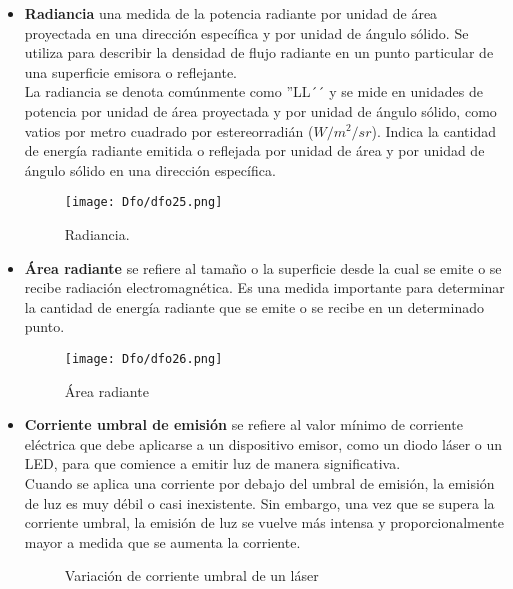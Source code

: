 \documentclass[
	12pt, %
	fleqn, %
	a4paper, %
	oneside, %
]{LegrandOrangeBook}
\begin{document}
\begin{itemize}
\item \textbf{Radiancia} una medida de la potencia radiante por unidad de área proyectada en una dirección específica y por unidad de ángulo sólido. Se utiliza para describir la densidad de flujo radiante en un punto particular de una superficie emisora o reflejante.\\
La radiancia se denota comúnmente como ''LL´´ y se mide en unidades de potencia por unidad de área proyectada y por unidad de ángulo sólido, como vatios por metro cuadrado por estereorradián ($W/m^2/sr$). Indica la cantidad de energía radiante emitida o reflejada por unidad de área y por unidad de ángulo sólido en una dirección específica.
\begin{figure}[H]
\centering
\texttt{[image: Dfo/dfo25.png]}
\caption{Radiancia.}
\end{figure}

\item \textbf{Área radiante} se refiere al tamaño o la superficie desde la cual se emite o se recibe radiación electromagnética. Es una medida importante para determinar la cantidad de energía radiante que se emite o se recibe en un determinado punto.
\begin{figure}[H]
\centering
\texttt{[image: Dfo/dfo26.png]}
\caption{Área radiante}
\end{figure}

\item \textbf{Corriente umbral de emisión} se refiere al valor mínimo de corriente eléctrica que debe aplicarse a un dispositivo emisor, como un diodo láser o un LED, para que comience a emitir luz de manera significativa.\\
Cuando se aplica una corriente por debajo del umbral de emisión, la emisión de luz es muy débil o casi inexistente. Sin embargo, una vez que se supera la corriente umbral, la emisión de luz se vuelve más intensa y proporcionalmente mayor a medida que se aumenta la corriente.
\begin{figure}[H]
\centering
{}
\caption{Variación de corriente umbral de un láser}
\end{figure}


\end{itemize}
\end{document}
